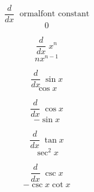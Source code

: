 \documentclass[avery5371,grid]{flashcards}
\begin{document}
\begin{flashcard}{\large \vspace*{\fill} \[ \dfrac{d}{dx}\; \text{ 
ormalfont constant}  \] \vspace*{\fill}   }{\large \vspace*{\fill} \[ 0   \] \vspace*{\fill}   }\end{flashcard}

\begin{flashcard}{\large \vspace*{\fill} \[ \dfrac{d}{dx}\; x^n  \] \vspace*{\fill}   }{\large \vspace*{\fill} \[ nx^{n-1}   \] \vspace*{\fill}   }\end{flashcard}

\begin{flashcard}{\large \vspace*{\fill} \[ \dfrac{d}{dx}\; \sin x  \] \vspace*{\fill}   }{\large \vspace*{\fill} \[ \cos x   \] \vspace*{\fill}   }\end{flashcard}

\begin{flashcard}{\large \vspace*{\fill} \[ \dfrac{d}{dx}\; \cos x  \] \vspace*{\fill}   }{\large \vspace*{\fill} \[ -\sin x   \] \vspace*{\fill}   }\end{flashcard}

\begin{flashcard}{\large \vspace*{\fill} \[ \dfrac{d}{dx}\; \tan x  \] \vspace*{\fill}   }{\large \vspace*{\fill} \[ \sec^2 x   \] \vspace*{\fill}   }\end{flashcard}

\begin{flashcard}{\large \vspace*{\fill} \[ \dfrac{d}{dx}\; \csc x  \] \vspace*{\fill}   }{\large \vspace*{\fill} \[ -\csc x \cot x   \] \vspace*{\fill}   }\end{flashcard}
\end{document}
